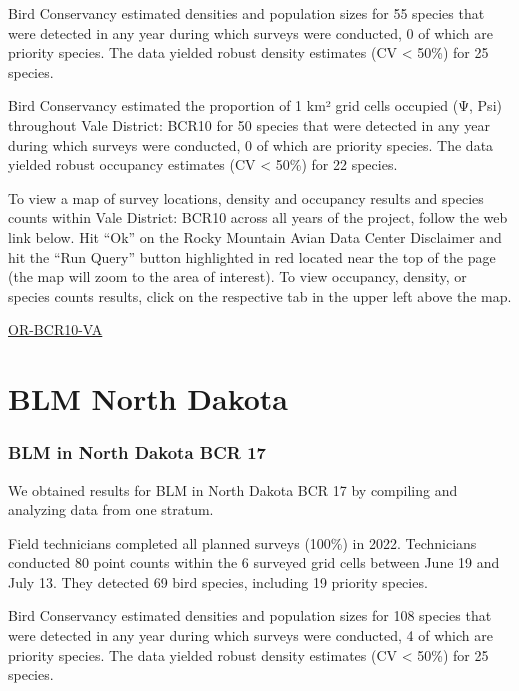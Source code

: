 \documentclass[
  letterpaper,
  DIV=11,
  numbers=noendperiod,
  oneside]{scrreprt}
\begin{document}
Bird Conservancy estimated densities and population sizes for 55 species
that were detected in any year during which surveys were conducted, 0 of
which are priority species. The data yielded robust density estimates
(CV \textless{} 50\%) for 25 species.

Bird Conservancy estimated the proportion of 1 km² grid cells occupied
(Ψ, Psi) throughout Vale District: BCR10 for 50 species that were
detected in any year during which surveys were conducted, 0 of which are
priority species. The data yielded robust occupancy estimates (CV
\textless{} 50\%) for 22 species.

To view a map of survey locations, density and occupancy results and
species counts within Vale District: BCR10 across all years of the
project, follow the web link below. Hit ``Ok'' on the Rocky Mountain
Avian Data Center Disclaimer and hit the ``Run Query'' button
highlighted in red located near the top of the page (the map will zoom
to the area of interest). To view occupancy, density, or species counts
results, click on the respective tab in the upper left above the map.

\href{http://www.rmbo.org/new_site/adc/QueryWindow.aspx\#N4IgzgLgTghhCuBbEAuABCA8gJQLQCEBhbARgAZcA1AQRX3igFMZ40B7AMzQBkYA7ACZoAsvxgBzRokZ8IuNJRgAbRmgAiAS0hQNAYwggAvkA===}{OR-BCR10-VA}

\hypertarget{blm-north-dakota}{%
\section{BLM North Dakota}\label{blm-north-dakota}}

\hypertarget{blm-in-north-dakota-bcr-17}{%
\subsubsection{BLM in North Dakota BCR
17}\label{blm-in-north-dakota-bcr-17}}

We obtained results for BLM in North Dakota BCR 17 by compiling and
analyzing data from one stratum.

Field technicians completed all planned surveys (100\%) in 2022.
Technicians conducted 80 point counts within the 6 surveyed grid cells
between June 19 and July 13. They detected 69 bird species, including 19
priority species.

Bird Conservancy estimated densities and population sizes for 108
species that were detected in any year during which surveys were
conducted, 4 of which are priority species. The data yielded robust
density estimates (CV \textless{} 50\%) for 25 species.
\end{document}
